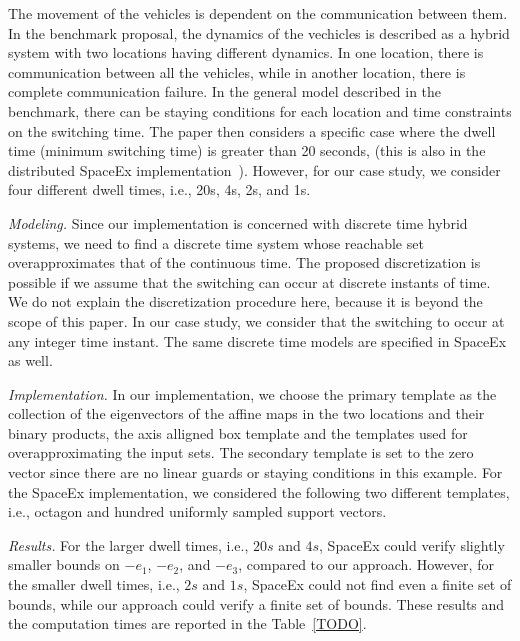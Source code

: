 The movement of the vehicles is dependent on the communication between
them.  In the benchmark proposal, the dynamics of the vechicles is
described as a hybrid system with two locations having different
dynamics.  In one location, there is communication between all the
vehicles, while in another location, there is complete communication
failure.  In the general model described in the benchmark, there can
be staying conditions for each location and time constraints on the
switching time.  The paper then considers a specific case where the
dwell time (minimum switching time) is greater than 20 seconds, (this
is also in the distributed SpaceEx implementation~\cite{TODO}).
However, for our case study, we consider four different dwell times,
i.e., 20s, 4s, 2s, and 1s.


\emph{Modeling.}  Since our implementation is concerned with discrete
time hybrid systems, we need to find a discrete time system whose
reachable set overapproximates that of the continuous time.  The
proposed discretization is possible if we assume that the switching
can occur at discrete instants of time.  We do not explain the
discretization procedure here, because it is beyond the scope of this
paper.  In our case study, we consider that the switching to occur at
any integer time instant.  The same discrete time models are
specified in SpaceEx as well.  

\emph{Implementation.}  In our implementation, we choose the primary
template as the collection of the eigenvectors of the affine maps in
the two locations and their binary products, the axis alligned box
template and the templates used for overapproximating the input sets.
The secondary template is set to the zero vector since there are no
linear guards or staying conditions in this example.  For the SpaceEx
implementation, we considered the following two different templates,
i.e., octagon and hundred uniformly sampled support vectors.

\emph{Results.}  For the larger dwell times, i.e., $20s$ and $4s$,
SpaceEx could verify slightly smaller bounds on $-e_1$, $-e_2$, and
$-e_3$, compared to our approach.  However, for the smaller dwell
times, i.e., $2s$ and $1s$, SpaceEx could not find even a finite set of
bounds, while our approach could verify a finite set of bounds.  These
results and the computation times are reported in the
Table~\ref{TODO}.


